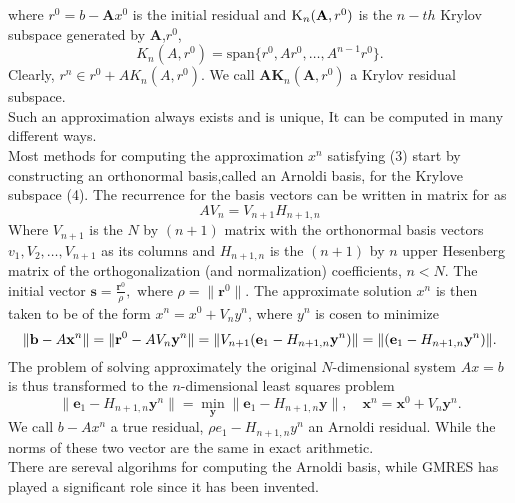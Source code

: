 where $r^0=b-\textbf{A}x^0$ is the initial residual and $\textsc{K}_n(\textbf{A},r^0)$ is the $n-th$ Krylov subspace generated by \textbf{A},$r^0$,
\begin{equation}
    K_n(A, r^0) = \text{span}\{r^0, Ar^0, \dots, A^{n-1}r^0\}.
\end{equation}
Clearly, $r^n \in r^0 + A K_n(A, r^0)$. We call $\textbf{AK}_{n}(\textbf{A},r^0)$ a Krylov residual subspace. \\
Such an approximation always exists and is unique, It can be computed in many different ways. \\
Most methods for computing the approximation $x^n$ satisfying (3) start by constructing an orthonormal basis,called an Arnoldi basis, for the Krylove subspace  (4). The recurrence for the basis vectors can be written in matrix for as 
\begin{equation}
    AV_n=V_{n+1}H_{n+1,n}
\end{equation}
Where $V_{n+1}$ is the $N$ by $(n+1)$ matrix with the orthonormal basis vectors $v_1,V_2,\dots,V_{n+1}$ as its columns and $H_{n+1,n}$ is the $(n+1)$ by $n$ upper Hesenberg matrix of the orthogonalization (and normalization) coefficients, $n<N$. The initial vector $\mathbf{s} = \frac{\mathbf{r}^0}{\rho}, \text{ where } \rho = \|\mathbf{r}^0\|.$ The approximate solution $x^n$ is then taken to be of the form $x^n=x^0+V_ny^n$, where $y^n$ is cosen to minimize
\begin{equation}
    \| \mathbf{b} - A\mathbf{x}^n \| = \| \mathbf{r}^0 - AV_n\mathbf{y}^n \| \\
= \| V_{n+1}(\mathbf{e}_1 - H_{n+1,n}\mathbf{y}^n) \| \\
= \| (\mathbf{e}_1 - H_{n+1,n}\mathbf{y}^n) \|.
\end{equation}
The problem of solving approximately the original $N$-dimensional system $Ax=b$ is thus transformed to the $n$-dimensional least squares problem
\begin{equation}
    \| \mathbf{e}_1 - H_{n+1,n}\mathbf{y}^n \| = \min_{\mathbf{y}} \| \mathbf{e}_1 - H_{n+1,n}\mathbf{y} \|, \quad \mathbf{x}^n = \mathbf{x}^0 + V_n\mathbf{y}^n.
\end{equation}
We call $b-Ax^n$ a true residual, $\rho e_1 - H_{n+1,n}y^n$ an Arnoldi residual. While the norms of these two vector are the same in exact arithmetic.\\
There are sereval algorihms for computing the Arnoldi basis, while GMRES has played a significant role since it has been invented.\\

